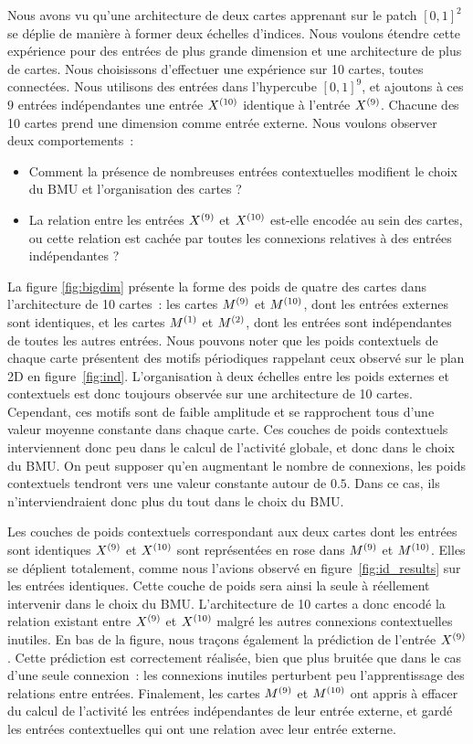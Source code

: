 \documentclass[../main]{subfiles}
\begin{document}
Nous avons vu qu'une architecture de deux cartes apprenant sur le patch $[0,1]^2$ se déplie de manière à former deux échelles d'indices. 
Nous voulons étendre cette expérience pour des entrées de plus grande dimension et une architecture de plus de cartes. 
Nous choisissons d'effectuer une expérience sur 10 cartes, toutes connectées.
Nous utilisons des entrées dans l'hypercube $[0,1]^9$, et ajoutons à ces $9$ entrées indépendantes une entrée $X^{({10})}$ identique à l'entrée $X^{({9})}$. Chacune des 10 cartes prend une dimension comme entrée externe.
Nous voulons observer deux comportements~:
\begin{itemize}
	\item Comment la présence de nombreuses entrées contextuelles modifient le choix du BMU et l'organisation des cartes ?
	\item La relation entre les entrées $X^{({9})}$ et $X^{({10})}$ est-elle encodée au sein des cartes, ou cette relation est \og cachée \fg{} par toutes les connexions relatives à des entrées indépendantes ? 
\end{itemize}

La figure \ref{fig:bigdim} présente la forme des poids de quatre des cartes dans l'architecture de 10 cartes~: les cartes $M^{({9})}$ et $M^{({10})}$, dont les entrées externes sont identiques, et les cartes $M^{({1})}$ et $M^{({2})}$, dont les entrées sont indépendantes de toutes les autres entrées.
Nous pouvons noter que les poids contextuels de chaque carte présentent des motifs périodiques rappelant ceux observé sur le plan 2D en figure~\ref{fig:ind}. L'organisation à deux échelles entre les poids externes et contextuels est donc toujours observée sur une architecture de 10 cartes.
Cependant, ces motifs sont de faible amplitude et se rapprochent tous d'une valeur moyenne constante dans chaque carte. Ces couches de poids contextuels interviennent donc peu dans le calcul de l'activité globale, et donc dans le choix du BMU. On peut supposer qu'en augmentant le nombre de connexions, les poids contextuels tendront vers une valeur constante autour de $0.5$. Dans ce cas, ils n'interviendraient donc plus du tout dans le choix du BMU.

Les couches de poids contextuels correspondant aux deux cartes dont les entrées sont identiques $X^{({9})}$ et $X^{({10})}$ sont représentées en rose dans $M^{({9})}$ et $M^{({10})}$. 
Elles se déplient totalement, comme nous l'avions observé en figure~\ref{fig:id_results} sur les entrées identiques. Cette couche de poids sera ainsi la seule à réellement intervenir dans le choix du BMU. L'architecture de 10 cartes a donc encodé la relation existant entre $X^{({9})}$ et $X^{({10})}$ malgré les autres connexions contextuelles inutiles.
En bas de la figure, nous traçons également la prédiction de l'entrée $X^{({9})}$.
Cette prédiction est correctement réalisée, bien que plus bruitée que dans le cas d'une seule connexion~: les connexions inutiles  perturbent peu l'apprentissage des relations entre entrées. 
Finalement, les cartes $M^{({9})}$ et $M^{({10})}$ ont appris à effacer du calcul de l'activité les entrées indépendantes de leur entrée externe, et gardé les entrées contextuelles qui ont une relation avec leur entrée externe.
\end{document}
